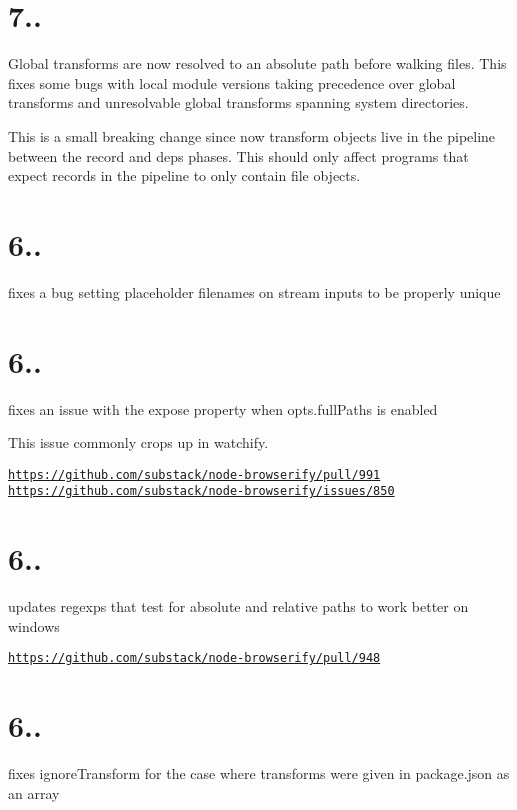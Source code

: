 \section*{7..}

Global transforms are now resolved to an absolute path before walking files. This fixes some bugs with local module versions taking precedence over global transforms and unresolvable global transforms spanning system directories.

This is a small breaking change since now transform objects live in the pipeline between the record and deps phases. This should only affect programs that expect records in the pipeline to only contain file objects.

\section*{6..}

fixes a bug setting placeholder filenames on stream inputs to be properly unique

\section*{6..}

fixes an issue with the expose property when opts.\+full\+Paths is enabled

This issue commonly crops up in watchify.

\href{https://github.com/substack/node-browserify/pull/991}{\tt https\+://github.\+com/substack/node-\/browserify/pull/991} \href{https://github.com/substack/node-browserify/issues/850}{\tt https\+://github.\+com/substack/node-\/browserify/issues/850}

\section*{6..}

updates regexps that test for absolute and relative paths to work better on windows

\href{https://github.com/substack/node-browserify/pull/948}{\tt https\+://github.\+com/substack/node-\/browserify/pull/948}

\section*{6..}

fixes ignore\+Transform for the case where transforms were given in package.\+json as an array


